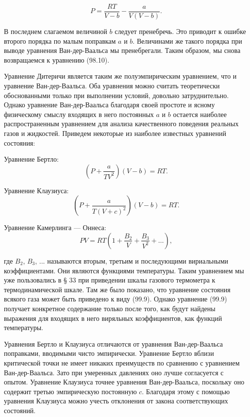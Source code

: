 \documentclass[12pt]{article} %
\begin{document}
$$
P = \frac{RT}{V - b} - \frac{a}{V(V - b)}.
$$

В последнем слагаемом величиной $b$ следует пренебречь. Это приводит к ошибке второго порядка по малым поправкам $a$ и $b$. Величинами же такого порядка при выводе уравнения Ван-дер-Ваальса мы пренебрегали. Таким образом, мы снова возвращаемся к уравнению (98.10).

Уравнение Дитеричи является таким же полуэмпирическим уравнением, что и уравнение Ван-дер-Ваальса. Оба уравнения можно считать теоретически обоснованными только при выполнении условий, довольно затруднительно. Однако уравнение Ван-дер-Ваальса благодаря своей простоте и ясному физическому смыслу входящих в него постоянных $a$ и $b$ остается наиболее распространенным уравнением для анализа качественного поведения реальных газов и жидкостей. Приведем некоторые из наиболее известных уравнений состояния:

Уравнение Бертло:
\begin{equation}
\left(P + \frac{a}{TV^2}\right)(V - b) = RT. \tag{99.7}
\end{equation}

Уравнение Клаузиуса:
\begin{equation}
\left(P + \frac{a}{T(V + c)^2}\right)(V - b) = RT. \tag{99.8}
\end{equation}

Уравнение Камерлинга — Оннеса:
\begin{equation}
PV = RT\left(1 + \frac{B_2}{V} + \frac{B_3}{V^2} + \ldots\right), \tag{99.9}
\end{equation}

где $B_2$, $B_3$, ... называются вторым, третьим и последующими вириальными коэффициентами. Они являются функциями температуры. Таким уравнением мы уже пользовались в § 33 при приведении шкалы газового термометра к термодинамической шкале. Там же было показано, что уравнение состояния всякого газа может быть приведено к виду (99.9). Однако уравнение (99.9) получает конкретное содержание только после того, как будут найдены выражения для входящих в него виряльных коэффициентов, как функций температуры.

Уравнения Бертло и Клаузиуса отличаются от уравнения Ван-дер-Ваальса поправками, вводимыми чисто эмпирически. Уравнение Бертло вблизи критической точки не имеет никаких преимуществ по сравнению с уравнением Ван-дер-Ваальса. Зато при умеренных давлениях оно лучше согласуется с опытом. Уравнение Клаузиуса точнее уравнения Ван-дер-Ваальса, поскольку оно содержит третью эмпирическую постоянную $c$. Благодаря этому с помощью уравнения Клаузиуса можно учесть отклонения от закона соответствующих состояний.
\end{document}
